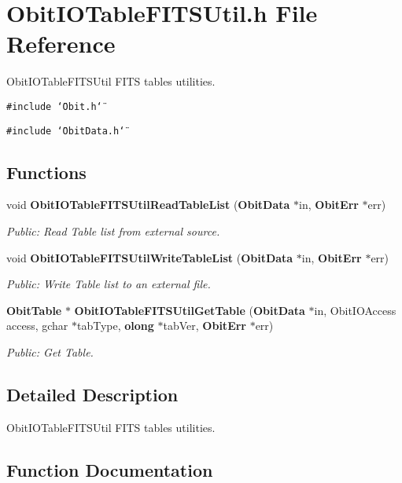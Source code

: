 \section{Obit\-IOTable\-FITSUtil.h File Reference}
\label{ObitIOTableFITSUtil_8h}
Obit\-IOTable\-FITSUtil FITS tables utilities. 

{\tt \#include \char`\"{}Obit.h\char`\"{}}\par
{\tt \#include \char`\"{}Obit\-Data.h\char`\"{}}\par
\subsection*{Functions}
\begin{CompactItemize}
\item 
void {\bf Obit\-IOTable\-FITSUtil\-Read\-Table\-List} ({\bf Obit\-Data} $\ast$in, {\bf Obit\-Err} $\ast$err)
\begin{CompactList}\small\item\em Public: Read Table list from external source. \item\end{CompactList}\item 
void {\bf Obit\-IOTable\-FITSUtil\-Write\-Table\-List} ({\bf Obit\-Data} $\ast$in, {\bf Obit\-Err} $\ast$err)
\begin{CompactList}\small\item\em Public: Write Table list to an external file. \item\end{CompactList}\item 
{\bf Obit\-Table} $\ast$ {\bf Obit\-IOTable\-FITSUtil\-Get\-Table} ({\bf Obit\-Data} $\ast$in, Obit\-IOAccess access, gchar $\ast$tab\-Type, {\bf olong} $\ast$tab\-Ver, {\bf Obit\-Err} $\ast$err)
\begin{CompactList}\small\item\em Public: Get Table. \item\end{CompactList}\end{CompactItemize}


\subsection{Detailed Description}
Obit\-IOTable\-FITSUtil FITS tables utilities. 



\subsection{Function Documentation}
